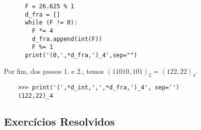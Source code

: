 \begin{ex}
\begin{enumerate}[1.]
    \ifispython
    \begin{lstlisting}
      F = 26.625 % 1
      d_fra = []
      while (F != 0):
        F *= 4
        d_fra.append(int(F))
        F %= 1
      print('(0,',*d_fra,')_4',sep="")
    \end{lstlisting}
    \fi
  \end{enumerate}

  Por fim, dos passos 1. e 2., temos $(11010,101)_2 = (122,22)_4$.

  \ifispython
  \begin{lstlisting}
    >>> print('(',*d_int,',',*d_fra,')_4', sep='')
    (122,22)_4
  \end{lstlisting}
  \fi
\end{ex}

\subsection{Exercícios Resolvidos}

